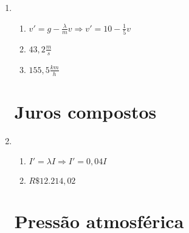 \documentclass[a4paper]{article}
\begin{document}
\begin{enumerate}

\item 
  \begin{enumerate}
  \item $v' = g- \frac{\lambda}{m}v \Rightarrow v' = 10-\frac{1}{5}v$
  \item $43,2\frac{m}{s}$
  \item $155,5 \frac{km}{h}$
  \end{enumerate}

\section{Juros compostos}



\item 
  \begin{enumerate}
  \item $I' = \lambda I \Rightarrow I' = 0,04I$
  \item $R\$ 12.214,02$
  \end{enumerate}


\section{Pressão atmosférica}


\end{enumerate}
\end{document}

